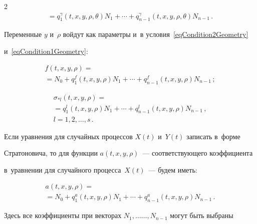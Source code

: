 \begin{multicols}{2}
\begin{multline*}
  {}= q_1^\gamma(t,x,y,\rho,\theta) N_1 + 

  \cdots + q_{n-1}^\gamma(t,x,y,\rho,\theta) N_{n-1}\,.

\end{multline*}

Переменные $y$ и~$\rho$ войдут как параметры и~в условия~\eqref{eqCondition2Geometry} 

и~\eqref{eqCondition1Geometry}:

\begin{multline*}

  f(t,x,y,\rho) ={}\\

  {}= N_0 + q_1^f(t,x,y,\rho) N_1 + \cdots + q_{n-1}^f(t,x,y,\rho) N_{n-1}\,;

\end{multline*}



\vspace*{-12pt}



\noindent

\begin{multline*}

  \sigma_{* l}(t,x,y,\rho) = {}\\

  {}=q_1^l(t,x,y,\rho) N_1 + 

  \cdots + q_{n-1}^l(t,x,y,\rho) N_{n-1}\,,\\

   l = 1,2,\dots,s\,.

\end{multline*}

Если уравнения для случайных процессов $X(t)$ и~$Y(t)$ записать в~форме 

Стратоновича, то для функции $a(t,x,y,\rho)$~--- соответствующего коэффициента 

в~уравнении для случайного процесса~$X(t)$~--- будем иметь:

\begin{multline*}

  a(t,x,y,\rho) ={}\\

  {}= N_0 + q_1^a(t,x,y,\rho) N_1 + \cdots + 

  q_{n-1}^a(t,x,y,\rho) N_{n-1}\,.

\end{multline*}

Здесь все коэффициенты при векторах $N_1, \ldots$\linebreak $\ldots, N_{n-1}$ могут быть выбраны 


\end{multicols}
